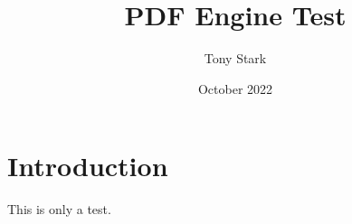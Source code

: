 \documentclass{article}
\title{PDF Engine Test}
\author{Tony Stark}
\date{October 2022}
\begin{document}
\maketitle

\section{Introduction}
\par
This is only a test.
\end{document}
